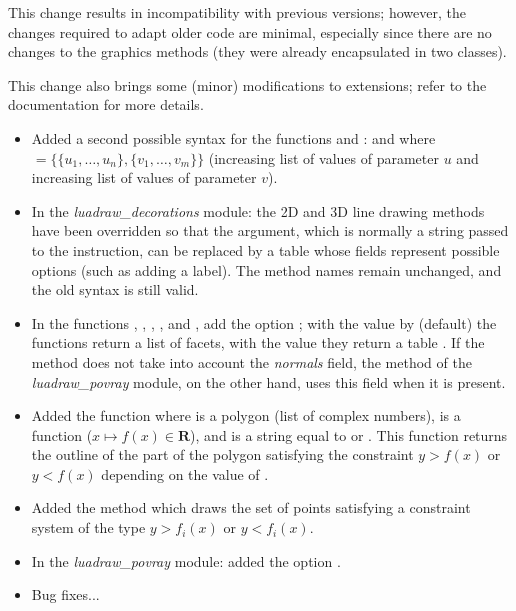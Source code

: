 This change results in incompatibility with previous versions; however, the changes required to adapt older code are minimal, especially since there are no changes to the graphics methods (they were already encapsulated in two classes).

This change also brings some (minor) modifications to extensions; refer to the documentation for more details.

\begin{itemize}
    \item Added a second possible syntax for the functions  and :  and  where $=\{\{u_1,\ldots,u_n\}, \{v_1,\ldots,v_m\}\}$ (increasing list of values ​​of parameter $u$ and increasing list of values ​​of parameter $v$).
    
    \item In the \emph{luadraw\_decorations} module: the 2D and 3D line drawing methods have been overridden so that the  argument, which is normally a string passed to the \drawcmd instruction, can be replaced by a table whose fields represent possible options (such as adding a label). The method names remain unchanged, and the old syntax is still valid.
    
    \item In the functions , , , ,  and , add the option ; with the value by \false (default) the functions return a list of facets, with the value \true they return a table . If the  method does not take into account the \emph{normals} field, the  method of the \emph{luadraw\_povray} module, on the other hand, uses this field when it is present.
    
    \item Added the function  where  is a polygon (list of complex numbers),  is a function ($x\mapsto f(x)\in \mathbf R$), and  is a string equal to  or . This function returns the outline of the part of the polygon satisfying the constraint $y>f(x)$ or $y<f(x)$ depending on the value of .

    \item Added the method  which draws the set of points satisfying a constraint system of the type $y>f_i(x)$ or $y<f_i(x)$.

    \item In the \emph{luadraw\_povray} module: added the option .
    
    \item Bug fixes...
\end{itemize}

